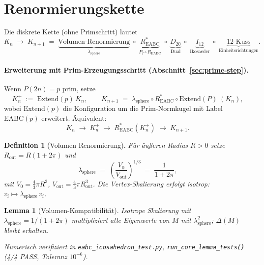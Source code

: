\documentclass[11pt,a4paper]{article}
\newtheorem{definition}{Definition}
\newtheorem{lemma}{Lemma}
\begin{document}
	\section{Renormierungskette}
	
	Die diskrete Kette (ohne Primschritt) lautet
	\[
	K_n \;\longrightarrow\; K_{n+1}
	\;=\;
	\underbrace{\text{Volumen-Renormierung}}_{\lambda_{\mathrm{sphere}}}
	\;\circ\;
	\underbrace{R^*_{\mathrm{EABC}}}_{P_I \circ R_{\mathrm{EABC}}}
	\;\circ\;
	\underbrace{D_{20}}_{\text{Dual}}
	\;\circ\;
	\underbrace{I_{12}}_{\text{Ikosaeder}}
	\;\circ\;
	\underbrace{\text{12-Kuss}}_{\text{Einheitsrichtungen}}.
	\]
	
	\paragraph{Erweiterung mit Prim-Erzeugungsschritt (Abschnitt~\ref{sec:prime-step}).}
	Wenn $P(2n)=p$ prim, setze
	\[
	K_n^+ \;:=\; \mathrm{Extend}(p)\,K_n,
	\qquad
	K_{n+1}
	\;=\;
	\lambda_{\mathrm{sphere}}
	\circ R^*_{\mathrm{EABC}}
	\circ \mathrm{Extend}(P)
	\;(K_n),
	\]
	wobei $\mathrm{Extend}(p)$ die Konfiguration um die Prim-Normkugel mit
	Label $\mathrm{EABC}(p)$ erweitert.
	Äquivalent:
	\[
	K_n \;\longrightarrow\; K_n^+ \;\longrightarrow\;
	R^*_{\mathrm{EABC}}(K_n^+) \;\longrightarrow\; K_{n+1}.
	\]
	
	\begin{definition}[Volumen-Renormierung]
		Für äußeren Radius $R>0$ setze $R_{\mathrm{out}}=R(1+2\pi)$ und
		\[
		\lambda_{\mathrm{sphere}}
		\;=\;
		\left(\frac{V_0}{V_{\mathrm{out}}}\right)^{\!1/3}
		\;=\;
		\frac{1}{1+2\pi},
		\]
		mit $V_0=\tfrac{4}{3}\pi R^3$, $V_{\mathrm{out}}=\tfrac{4}{3}\pi R_{\mathrm{out}}^3$.
		Die Vertex-Skalierung erfolgt isotrop: $v_i\mapsto \lambda_{\mathrm{sphere}}\,v_i$.
	\end{definition}
	
	\begin{lemma}[Volumen-Kompatibilität]
		Isotrope Skalierung mit $\lambda_{\mathrm{sphere}} = 1/(1+2\pi)$ multipliziert alle
		Eigenwerte von $M$ mit $\lambda_{\mathrm{sphere}}^2$; $\Delta(M)$ bleibt erhalten.
	\end{lemma}
	
	\smallskip\noindent
	\textit{Numerisch verifiziert in \texttt{eabc\_icosahedron\_test.py},
		\texttt{run\_core\_lemma\_tests()} (4/4 PASS, Toleranz $10^{-6}$).}
	
\end{document}
